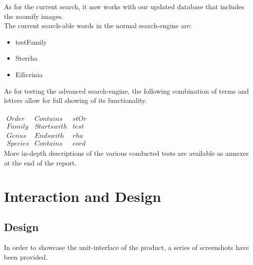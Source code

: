\documentclass[12pt,a4paper]{article}
\begin{document}
As for the current search, it now works with our updated database that includes the zoomify images.\\
The current search-able words in the normal search-engine are:

\begin{itemize}
	\item testFamily
	\item Sterrha
	\item Eilicrinia
\end{itemize}

As for testing the advanced search-engine, the following combination of terms and letters allow for full showing of its functionality.
\\\\
$
\begin{array}{c|c|c}
Order & Contains & stOr \\ 
Family & Starts with & test \\ 
Genus & Ends with & rha \\ 
Species & Contains & cord
\end{array}
$
\\

More in-depth descriptions of the various conducted tests are available as annexes at the end of the report.

\newpage
\section{Interaction and Design}
\subsection{Design}

In order to showcase the unit-interface of the product, a series of screenshots have been provided.
\end{document}
